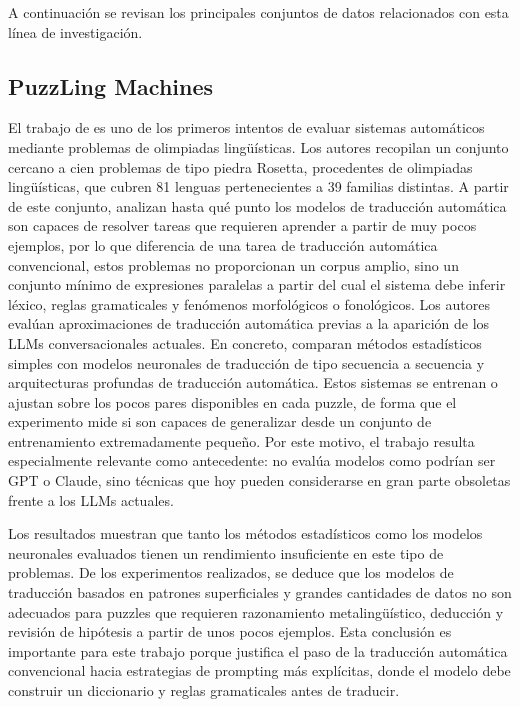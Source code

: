 A continuación se revisan los principales conjuntos de datos relacionados con esta línea de investigación.

\subsection{PuzzLing Machines}

El trabajo de \citet{sahin2020puzzling} es uno de los primeros intentos de evaluar sistemas automáticos mediante problemas de olimpiadas lingüísticas. Los autores recopilan un conjunto cercano a cien problemas de tipo piedra Rosetta, procedentes de olimpiadas lingüísticas, que cubren 81 lenguas pertenecientes a 39 familias distintas. A partir de este conjunto, analizan hasta qué punto los modelos de traducción automática son capaces de resolver tareas que requieren aprender a partir de muy pocos ejemplos, por lo que diferencia de una tarea de traducción automática convencional, estos problemas no proporcionan un corpus amplio, sino un conjunto mínimo de expresiones paralelas a partir del cual el sistema debe inferir léxico, reglas gramaticales y fenómenos morfológicos o fonológicos. Los autores evalúan aproximaciones de traducción automática previas a la aparición de los LLMs conversacionales actuales. En concreto, comparan métodos estadísticos simples con modelos neuronales de traducción de tipo secuencia a secuencia y arquitecturas profundas de traducción automática. Estos sistemas se entrenan o ajustan sobre los pocos pares disponibles en cada puzzle, de forma que el experimento mide si son capaces de generalizar desde un conjunto de entrenamiento extremadamente pequeño. Por este motivo, el trabajo resulta especialmente relevante como antecedente: no evalúa modelos como podrían ser GPT o Claude, sino técnicas que hoy pueden considerarse en gran parte obsoletas frente a los LLMs actuales.

Los resultados muestran que tanto los métodos estadísticos como los modelos neuronales evaluados tienen un rendimiento insuficiente en este tipo de problemas. De los experimentos realizados, se deduce que los modelos de traducción basados en patrones superficiales y grandes cantidades de datos no son adecuados para puzzles que requieren razonamiento metalingüístico, deducción y revisión de hipótesis a partir de unos pocos ejemplos. Esta conclusión es importante para este trabajo porque justifica el paso de la traducción automática convencional hacia estrategias de prompting más explícitas, donde el modelo debe construir un diccionario y reglas gramaticales antes de traducir.

